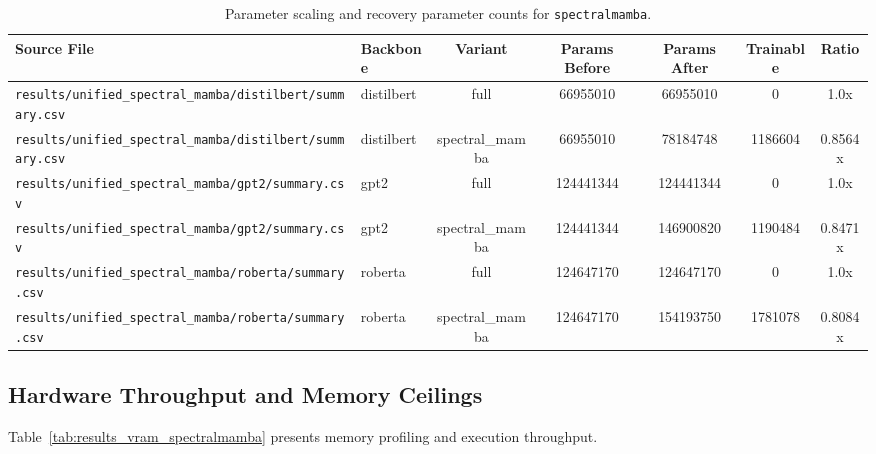 \begin{table}[t]
\centering
\small
\begin{tabular}{llccccc}
\toprule
\textbf{Source File} & \textbf{Backbone} & \textbf{Variant} & \textbf{Params Before} & \textbf{Params After} & \textbf{Trainable} & \textbf{Ratio} \\
\midrule
\texttt{results/unified\_spectral\_mamba/distilbert/summary.csv} & distilbert & full & 66955010 & 66955010 & 0 & 1.0x \\
\texttt{results/unified\_spectral\_mamba/distilbert/summary.csv} & distilbert & spectral\_mamba & 66955010 & 78184748 & 1186604 & 0.8564x \\
\texttt{results/unified\_spectral\_mamba/gpt2/summary.csv} & gpt2 & full & 124441344 & 124441344 & 0 & 1.0x \\
\texttt{results/unified\_spectral\_mamba/gpt2/summary.csv} & gpt2 & spectral\_mamba & 124441344 & 146900820 & 1190484 & 0.8471x \\
\texttt{results/unified\_spectral\_mamba/roberta/summary.csv} & roberta & full & 124647170 & 124647170 & 0 & 1.0x \\
\texttt{results/unified\_spectral\_mamba/roberta/summary.csv} & roberta & spectral\_mamba & 124647170 & 154193750 & 1781078 & 0.8084x \\
\bottomrule
\end{tabular}
\caption{Parameter scaling and recovery parameter counts for \texttt{spectralmamba}.}
\label{tab:results_params_spectralmamba}
\end{table}

\subsection{Hardware Throughput and Memory Ceilings}
Table~\ref{tab:results_vram_spectralmamba} presents memory profiling and execution throughput.

